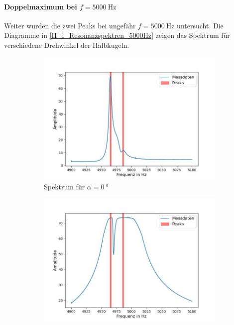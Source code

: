 \documentclass[../main.tex]{subfiles}
\begin{document}
\paragraph{Doppelmaximum bei $f=\SI{5000}{\hertz}$}
    Weiter wurden die zwei Peaks bei ungefähr $f=\SI{5000}{\hertz}$ untersucht. Die Diagramme in \ref{II_i_Resonanzspektren_5000Hz} zeigen das Spektrum für verschiedene Drehwinkel der Halbkugeln.

    \begin{figure}[H]
        \centering
        \begin{subfigure}[b]{0.45\textwidth}
            \centering
            \includegraphics[width=\textwidth]{Bilddateien/Auswertung/II_i_Resonanzspektrum_0_Grad.jpg}
            \caption{Spektrum für $\alpha=\SI{0}{\degree}$}
            \label{fig:II_i_Resonanzspektrum_0_Grad}
        \end{subfigure}
        \hfill
        \begin{subfigure}[b]{0.45\textwidth}
            \centering
            \includegraphics[width=\textwidth]{Bilddateien/Auswertung/II_i_Resonanzspektrum_90_Grad.jpg}

\end{subfigure}
\end{figure}
\end{document}

